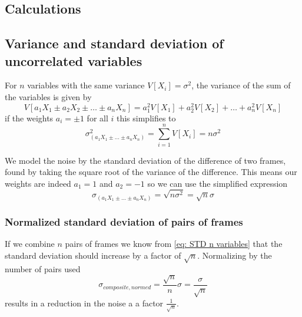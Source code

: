 \documentclass{emulateapj}
\begin{document}
\begin{appendices}
\section{Calculations}
\label{asec: Calculations}

\subsection{Variance and standard deviation of uncorrelated variables}
\label{asubsec: Var uncorrelated shown}
For $n$ variables with the same variance $V[X_i] = \sigma^2$, the variance of the sum of the variables \citep{STKbok} is given by
\begin{equation}
	V[a_1X_1 \pm a_2X_2 \pm \ldots \pm a_nX_n]  = a_1^2V[X_1] + a_2^2V[X_2] + \ldots + a_n^2V[X_n]
	\label{eq: Var n variables}
\end{equation}
if the weights $a_i = \pm 1$ for all $i$ this simplifies to
\begin{equation}
	\sigma_{(a_1X_1 \pm \ldots \pm a_nX_n)}^2 = \sum_{i=1}^n V[X_i]  = n \sigma^2
	\label{eq: Simplified Var n variables}
\end{equation}


We model the noise by the standard deviation of the difference of two frames, found by taking the square root of the variance of the difference. This means our weights are indeed $a_1=1$ and $a_2=-1$ so we can use the simplified expression
\begin{equation}
	\sigma_{(a_1X_1 \pm \ldots \pm a_nX_n)} = \sqrt{n\sigma^2} = \sqrt{n} \sigma
	\label{eq: STD n variables}
\end{equation}

\subsubsection{Normalized standard deviation of pairs of frames}
\label{asubsub: Normalized noise}
If we combine $n$ pairs of frames we know from \cref{eq: STD n variables} that the standard deviation should increase by a factor of $\sqrt{n}$. Normalizing by the number of pairs used
\begin{equation}
	\sigma_{composite, normed} =  \frac{\sqrt{n}}{n}\sigma = \frac{\sigma}{\sqrt{n}}
\end{equation}
results in a reduction in the noise a a factor $\frac{1}{\sqrt{n}}$.
\clearpage


\end{appendices}
\end{document}
